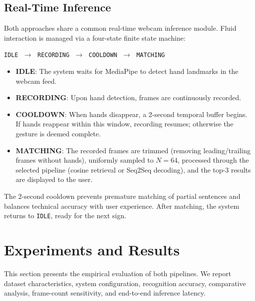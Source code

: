\documentclass[runningheads]{llncs}
\begin{document}
\subsection{Real-Time Inference}\label{sec:realtime}

Both approaches share a common real-time webcam inference module.
Fluid interaction is managed via a four-state finite state machine:
\begin{center}
\texttt{IDLE} $\;\rightarrow\;$ \texttt{RECORDING} $\;\rightarrow\;$
\texttt{COOLDOWN} $\;\rightarrow\;$ \texttt{MATCHING}
\end{center}

\begin{itemize}
    \item \textbf{IDLE}: The system waits for MediaPipe to detect hand
          landmarks in the webcam feed.
    \item \textbf{RECORDING}: Upon hand detection, frames are
          continuously recorded.
    \item \textbf{COOLDOWN}: When hands disappear, a 2-second temporal
          buffer begins.  If hands reappear within this window, recording
          resumes; otherwise the gesture is deemed complete.
    \item \textbf{MATCHING}: The recorded frames are trimmed (removing
          leading/trailing frames without hands), uniformly sampled to
          $N = 64$, processed through the selected pipeline (cosine
          retrieval or Seq2Seq decoding), and the top-3 results are
          displayed to the user.
\end{itemize}

The 2-second cooldown prevents premature matching of partial sentences
and balances technical accuracy with user experience.
After matching, the system returns to \texttt{IDLE}, ready for the next
sign.

\section{Experiments and Results}\label{sec:experiments}

This section presents the empirical evaluation of both pipelines.
We report dataset characteristics, system configuration, recognition
accuracy, comparative analysis, frame-count sensitivity, and
end-to-end inference latency.
\end{document}
